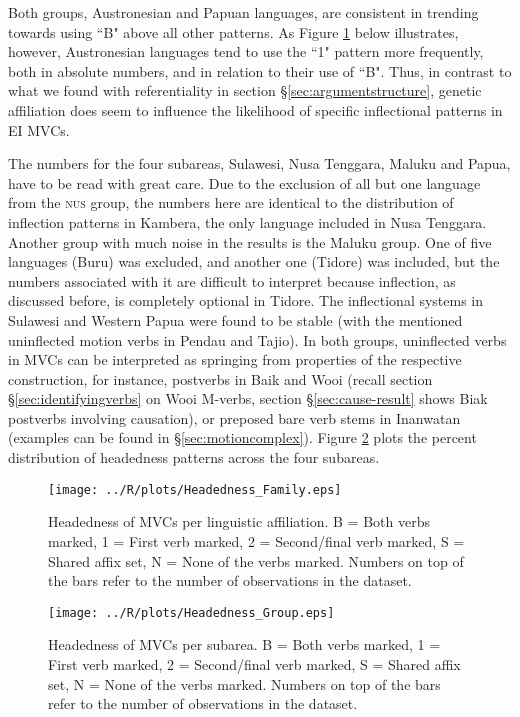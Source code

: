 Both groups, Austronesian and Papuan languages, are consistent in trending towards using ``B" above all other patterns. As Figure \ref{fig:head-family} below illustrates, however, Austronesian languages tend to use the ``1" pattern more frequently, both in absolute numbers, and in relation to their use of ``B". Thus, in contrast to what we found with referentiality in section §\ref{sec:argumentstructure}, genetic affiliation does seem to influence the likelihood of specific inflectional patterns in EI MVCs. 

The numbers for the four subareas, Sulawesi, Nusa Tenggara, Maluku and Papua, have to be read with great care. Due to the exclusion of all but one language from the \textsc{nus} group, the numbers here are identical to the distribution of inflection patterns in Kambera, the only language included in Nusa Tenggara. Another group with much noise in the results is the Maluku group. One of five languages (Buru) was excluded, and another one (Tidore) was included, but the numbers associated with it are difficult to interpret because inflection, as discussed before, is completely optional in Tidore. The inflectional systems in Sulawesi and Western Papua were found to be stable (with the mentioned uninflected motion verbs in Pendau and Tajio). In both groups, uninflected verbs in MVCs can be interpreted as springing from properties of the respective construction, for instance, postverbs in Baik and Wooi (recall section §\ref{sec:identifyingverbs} on Wooi M-verbs, section §\ref{sec:cause-result} shows Biak postverbs involving causation), or preposed bare verb stems in Inanwatan (examples can be found in §\ref{sec:motioncomplex}). Figure \ref{fig:head-group} plots the percent distribution of headedness patterns across the four subareas.

\begin{figure}
\texttt{[image: ../R/plots/Headedness\_Family.eps]}
\caption[Headedness of MVCs per linguistic affiliation]{Headedness of MVCs per linguistic affiliation. B = Both verbs marked, 1 = First verb marked, 2 = Second/final verb marked, S = Shared affix set, N = None of the verbs marked. Numbers on top of the bars refer to the number of observations in the dataset.}\label{fig:head-family}
\end{figure}
\begin{figure}
\texttt{[image: ../R/plots/Headedness\_Group.eps]}
\caption[Headedness of MVCs per subarea]{Headedness of MVCs per subarea. B = Both verbs marked, 1 = First verb marked, 2 = Second/final verb marked, S = Shared affix set, N = None of the verbs marked. Numbers on top of the bars refer to the number of observations in the dataset.}\label{fig:head-group}
\end{figure}

